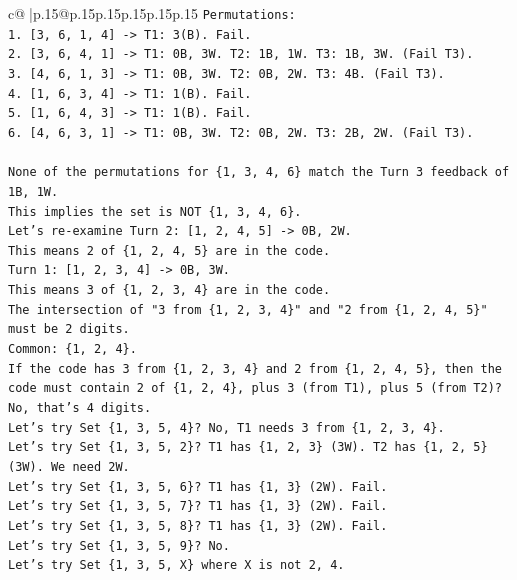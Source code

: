 \documentclass{article}
\begin{document}
{\begin{supertabular}{c@{$\;$}|p{.15\linewidth}@{}p{.15\linewidth}p{.15\linewidth}p{.15\linewidth}p{.15\linewidth}p{.15\linewidth}}
{{{\texttt{Permutations:} \\
\texttt{1.  {[}3, 6, 1, 4{]} {-}> T1: 3(B). Fail.} \\
\texttt{2.  {[}3, 6, 4, 1{]} {-}> T1: 0B, 3W. T2: 1B, 1W. T3: 1B, 3W. (Fail T3).} \\
\texttt{3.  {[}4, 6, 1, 3{]} {-}> T1: 0B, 3W. T2: 0B, 2W. T3: 4B. (Fail T3).} \\
\texttt{4.  {[}1, 6, 3, 4{]} {-}> T1: 1(B). Fail.} \\
\texttt{5.  {[}1, 6, 4, 3{]} {-}> T1: 1(B). Fail.} \\
\texttt{6.  {[}4, 6, 3, 1{]} {-}> T1: 0B, 3W. T2: 0B, 2W. T3: 2B, 2W. (Fail T3).} \\
\\ 
\texttt{None of the permutations for \{1, 3, 4, 6\} match the Turn 3 feedback of 1B, 1W.} \\
\texttt{This implies the set is NOT \{1, 3, 4, 6\}.} \\
\texttt{Let's re{-}examine Turn 2: {[}1, 2, 4, 5{]} {-}> 0B, 2W.} \\
\texttt{This means 2 of \{1, 2, 4, 5\} are in the code.} \\
\texttt{Turn 1: {[}1, 2, 3, 4{]} {-}> 0B, 3W.} \\
\texttt{This means 3 of \{1, 2, 3, 4\} are in the code.} \\
\texttt{The intersection of "3 from \{1, 2, 3, 4\}" and "2 from \{1, 2, 4, 5\}" must be 2 digits.} \\
\texttt{Common: \{1, 2, 4\}.} \\
\texttt{If the code has 3 from \{1, 2, 3, 4\} and 2 from \{1, 2, 4, 5\}, then the code must contain 2 of \{1, 2, 4\}, plus 3 (from T1), plus 5 (from T2)? No, that's 4 digits.} \\
\texttt{Let's try Set \{1, 3, 5, 4\}? No, T1 needs 3 from \{1, 2, 3, 4\}.} \\
\texttt{Let's try Set \{1, 3, 5, 2\}? T1 has \{1, 2, 3\} (3W). T2 has \{1, 2, 5\} (3W). We need 2W.} \\
\texttt{Let's try Set \{1, 3, 5, 6\}? T1 has \{1, 3\} (2W). Fail.} \\
\texttt{Let's try Set \{1, 3, 5, 7\}? T1 has \{1, 3\} (2W). Fail.} \\
\texttt{Let's try Set \{1, 3, 5, 8\}? T1 has \{1, 3\} (2W). Fail.} \\
\texttt{Let's try Set \{1, 3, 5, 9\}? No.} \\
\texttt{Let's try Set \{1, 3, 5, X\} where X is not 2, 4.} \\
}}}
\end{supertabular}}
\end{document}

